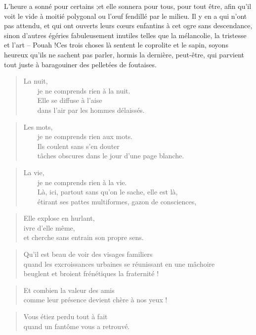   L'heure a  sonné pour certains  ;et elle sonnera  pour tous, pour  tout être,
  afin qu'il voit le vide à moitié polygonal ou l'œuf fendillé par le milieu.
  Il y en a  qui n'ont pas attendu, et qui ont ouverts  leurs cœurs enfantins à
  cet  ogre sans  descendance,  sinon d'autres  égéries fabuleusement  inutiles
  telles que  la mélancolie, la tristesse  et l'art – Pouah  !Ces trois choses
  là sentent  le coprolite  et le  sapin, soyons heureux  qu'ils ne  sachent pas
  parler, hormis la dernière, peut-être, qui parvient tout juste à baragouiner
  des pelletées de foutaises.
  \begin{verse}
    La nuit,\\
    ~~~~je ne comprends rien à la nuit.\\
    ~~~~Elle se diffuse à l'aise\\
    ~~~~dans l'air par les hommes délaissés.
  \end{verse}
  \begin{verse}
    Les mots,\\
    ~~~~je ne comprends rien aux mots.\\
    ~~~~Ils coulent sans s'en douter\\
    ~~~~tâches obscures dans le jour d'une page blanche.
  \end{verse}
  \begin{verse}
    La vie,\\
    ~~~~je ne comprends rien à la vie.\\
    ~~~~Là, ici, partout sans qu'on le sache, elle est là,\\
    ~~~~étirant ses pattes multiformes, gazon de consciences,
  \end{verse}
  \begin{verse}
    Elle explose en hurlant,\\
    ivre d'elle même,\\
    et cherche sans entrain son propre sens.
  \end{verse}
  \begin{verse}
    Qu'il est beau de voir des visages familiers\\
    quand les excroissances urbaines se réunissant en une mâchoire\\
    beuglent et broient frénétiques la fraternité !
  \end{verse}
  \begin{verse}
    Et combien la valeur des amis\\
    comme leur présence devient chère à nos yeux !
  \end{verse}
  \begin{verse}
    Vous étiez perdu tout à fait\\
    quand un fantôme vous a retrouvé.
  \end{verse}
